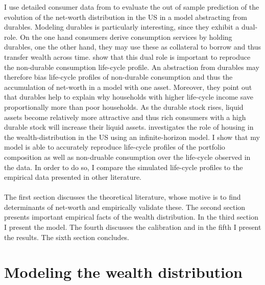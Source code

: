 \documentclass[a4paper,12pt]{article}
\begin{document}
I use detailed consumer data from \cite{hintermaier2011} to evaluate the out of sample prediction of the evolution of the net-worth distribution in the US in a model abstracting from durables. 
Modeling durables is particularly interesting, since they exhibit a dual-role. On the one hand consumers derive consumption services by holding durables, one the other hand, they may use these as collateral to borrow and thus transfer wealth across time. \cite{FV&K2011} show that this dual role is important to reproduce the non-durable consumption life-cycle profile. An abstraction from durables may therefore bias life-cycle profiles of non-durable consumption and thus the accumulation of net-worth in a model with one asset. Moreover, they point out that durables help to explain why households with higher life-cycle income save proportionally more than poor households. As the durable stock rises, liquid assets become relatively more attractive and thus rich consumers with a high durable stock will increase their liquid assets.\cite{diaz2010} investigates the role of housing in the wealth-distribution in the US  using an infinite-horizon model. 
I show that my model is able to accurately reproduce life-cycle profiles of the portfolio composition as well as non-druable consumption over the life-cycle observed in the data. In order to do so, I compare the simulated life-cycle profiles to the empirical data presented in other literature.
\\ \\
The first section discusses the theoretical literature, whose motive is to find determinants of net-worth and empirically validate these. The second section presents important empirical facts of the wealth distribution. In the third section I present the model. The fourth discusses the calibration and in the fifth I present the results. The sixth section concludes. 

\section{Modeling the wealth distribution}
\label{Modeling the wealth distribution}
\end{document}
